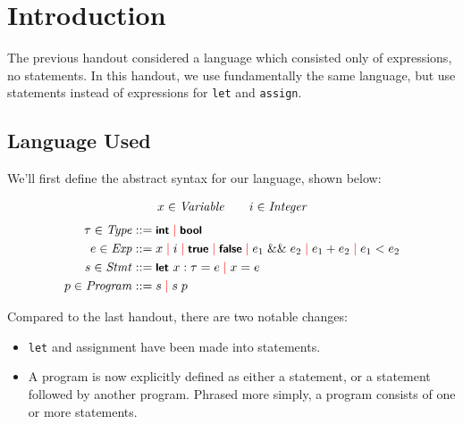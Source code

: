 \section{Introduction}
The previous handout considered a language which consisted only of expressions, no statements.
In this handout, we use fundamentally the same language, but use statements instead of expressions for \texttt{let} and \texttt{assign}.

\subsection{Language Used}
We'll first define the abstract syntax for our language, shown below:

\begin{gather*}
  x \in \mathit{Variable} \qquad i \in \mathit{Integer}
\end{gather*}
\begin{align*}
  \tau \in \mathit{Type} &::= \mbox{\sffamily{\bfseries\small {int}}} \; {\color{red}\mid}\; \mbox{\sffamily{\bfseries\small {bool}}}\\
  e \in \mathit{Exp} &::= x \; {\color{red}\mid}\; i \; {\color{red}\mid}\; \mbox{\sffamily{\bfseries\small {true}}} \; {\color{red}\mid}\; \mbox{\sffamily{\bfseries\small {false}}} \; {\color{red}\mid}\; e_1 \;\&\&\; e_2 \; {\color{red}\mid}\; e_1 + e_2 \; {\color{red}\mid}\; e_1 < e_2\\
  s \in \mathit{Stmt} &::= \mbox{\sffamily{\bfseries\small {let }}} x: \tau = e \; {\color{red}\mid}\; x = e\\
  p \in \mathit{Program} &::= s \; {\color{red}\mid}\; s \; p
\end{align*}

\noindent
Compared to the last handout, there are two notable changes:
\begin{itemize}
\item \texttt{let} and assignment have been made into statements.
\item A program is now explicitly defined as either a statement, or a statement followed by another program.
  Phrased more simply, a program consists of one or more statements.
\end{itemize}
